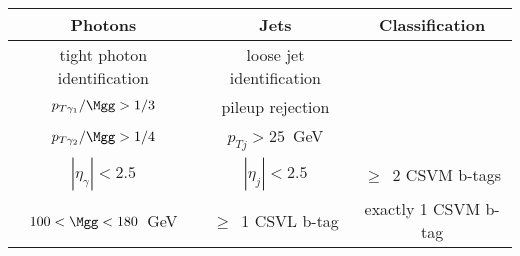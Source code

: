 \begin{tabular}{|c|c|c|}
\hline
Photons & Jets & Classification \\
\hline
tight photon identification                        & loose jet identification  & \\
$p_{T \gamma_1}/ \Mgg > 1/3$  & pileup rejection   & \\
$p_{T \gamma_2}/ \Mgg > 1/4$  & $p_{T j} >25$~GeV  & \\
$|\eta_{\gamma}|<2.5$                              & $|\eta_{j}|<2.5$  & $\ge$~2 CSVM b-tags \\
$ 100 < \Mgg < 180$~GeV                 & $\ge$~1 CSVL b-tag & exactly 1 CSVM b-tag \\
\hline
\end{tabular}
